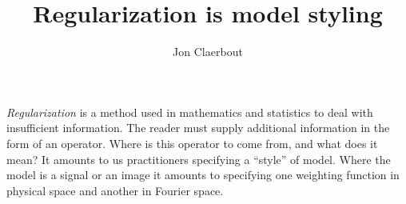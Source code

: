 
\title{Regularization is model styling}
\author{Jon Claerbout}
\maketitle

\label{paper:iin}
	
{\em Regularization} is a method used in mathematics and statistics
to deal with insufficient information.
The reader must supply additional information in the form of an operator.
Where is this operator to come from, and what does it mean?
It amounts to us practitioners specifying a ``style'' of model.
Where the model is a signal or an image
it amounts to specifying one weighting function in physical space
and another in Fourier space.


